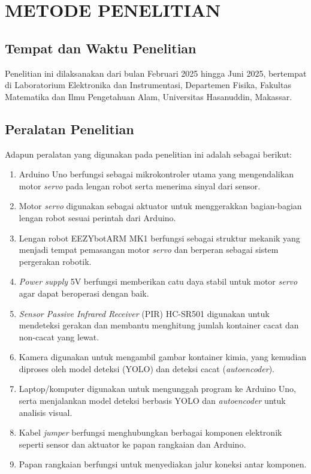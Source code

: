 \chapter{METODE PENELITIAN}
\section{Tempat dan Waktu Penelitian}
Penelitian ini dilaksanakan dari bulan Februari 2025 hingga Juni
2025, bertempat di Laboratorium Elektronika dan Instrumentasi,
Departemen Fisika, Fakultas Matematika dan Ilmu Pengetahuan Alam,
Universitas Hasanuddin, Makassar.

\vspace{1em}

\section{Peralatan Penelitian}
Adapun peralatan yang digunakan pada penelitian ini adalah sebagai berikut:
\begin{enumerate}
  \item Arduino Uno berfungsi sebagai mikrokontroler utama yang
    mengendalikan motor \textit{servo} pada lengan robot serta menerima sinyal
    dari sensor.
  \item Motor \textit{servo} digunakan sebagai aktuator untuk menggerakkan
    bagian-bagian lengan robot sesuai perintah dari Arduino.
  \item Lengan robot EEZYbotARM MK1 berfungsi sebagai struktur
    mekanik yang menjadi tempat pemasangan motor \textit{servo} dan berperan
    sebagai sistem pergerakan robotik.
  \item \textit{Power supply} 5V berfungsi memberikan catu daya stabil untuk
    motor \textit{servo} agar dapat beroperasi dengan baik.
  \item \textit{Sensor Passive Infrared Receiver} (PIR) HC-SR501
    digunakan untuk mendeteksi gerakan dan membantu
    menghitung jumlah kontainer cacat dan non-cacat yang lewat.
  \item Kamera digunakan untuk mengambil gambar kontainer kimia, yang
    kemudian diproses oleh model deteksi (YOLO) dan deteksi cacat
    (\textit{autoencoder}).
  \item Laptop/komputer digunakan untuk mengunggah program ke Arduino
    Uno, serta menjalankan model deteksi berbasis YOLO dan
    \textit{autoencoder} untuk analisis visual.
  \item Kabel \textit{jumper} berfungsi menghubungkan berbagai komponen
    elektronik seperti sensor dan aktuator ke papan rangkaian dan
    Arduino.
  \item Papan rangkaian berfungsi untuk menyediakan jalur koneksi
    antar komponen.
\end{enumerate}

